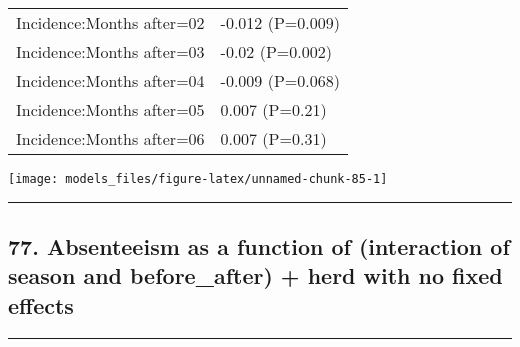 \documentclass[]{article}
\begin{document}
\begin{longtable}[t]{ll}
\hspace{1em}Incidence:Months after=02 & -0.012 (P=0.009)\\
\hspace{1em}Incidence:Months after=03 & -0.02 (P=0.002)\\
\hspace{1em}Incidence:Months after=04 & -0.009 (P=0.068)\\
\hspace{1em}Incidence:Months after=05 & 0.007 (P=0.21)\\
\hspace{1em}Incidence:Months after=06 & 0.007 (P=0.31)\\*
\end{longtable}

\begin{center}\texttt{[image: models\_files/figure-latex/unnamed-chunk-85-1]} \end{center}

\newpage

\begin{center}\rule{0.5\linewidth}{\linethickness}\end{center}

\subsection{77. Absenteeism as a function of (interaction of season and
before\_after) + herd with no fixed
effects}\label{absenteeism-as-a-function-of-interaction-of-season-and-before_after-herd-with-no-fixed-effects}

\begin{center}\rule{0.5\linewidth}{\linethickness}\end{center}
\end{document}

